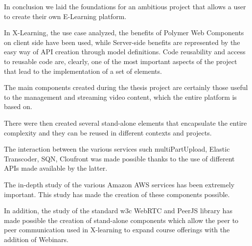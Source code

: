 In conclusion we laid the foundations for an ambitious project that allows a user to create their own E-Learning platform.

In X-Learning, the use case analyzed, the benefits of Polymer Web Components on client side have been used, while Server-side benefits are represented by the easy way of API creation through model definitions.
Code reusability and access to reusable code are, clearly, one of the most important aspects of the project that lead to the implementation of a set of elements.

The main components created during the thesis project are certainly those useful to the management and streaming video content, which the entire platform is based on.

There were then created several stand-alone elements that encapsulate the entire complexity and they can be reused in different contexts and projects.

The interaction between the various services such multiPartUpload, Elastic Transcoder, SQN, Cloufront was made possible thanks to the use of different APIs made available by the latter.

The in-depth study of the various Amazon AWS services has been extremely important. This study has made the creation of these components possible.

In addition, the study of the standard w3c WebRTC and PeerJS library has made possible the creation of stand-alone components which allow the peer to peer communication used in X-learning to expand course offerings with the addition of Webinars.